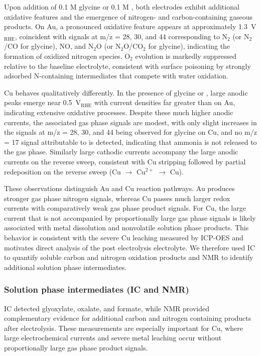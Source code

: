 \documentclass[twoside,twocolumn,9pt]{article}
\begin{document}
Upon addition of 0.1 M glycine or 0.1 M , both electrodes exhibit additional oxidative features and the emergence of nitrogen- and carbon-containing gaseous products. On Au, a pronounced oxidative feature appears at approximately 1.3~V$_{\mathrm{RHE}}$, coincident with signals at m/z = 28, 30, and 44 corresponding to N$_2$ (or N$_2$/CO for glycine), NO, and N$_2$O (or N$_2$O/CO$_2$ for glycine), indicating the formation of oxidized nitrogen species. O$_2$ evolution is markedly suppressed relative to the baseline electrolyte, consistent with surface poisoning by strongly adsorbed N-containing intermediates that compete with water oxidation.

Cu behaves qualitatively differently. In the presence of glycine or , large anodic peaks emerge near 0.5~V$_{\mathrm{RHE}}$ with current densities far greater than on Au, indicating extensive oxidative processes. Despite these much higher anodic currents, the associated gas phase signals are modest, with only slight increases in the signals at m/z = 28, 30, and 44 being observed for glycine on Cu, and no m/z = 17 signal attributable to  is detected, indicating that ammonia is not released to the gas phase. Similarly large cathodic currents accompany the large anodic currents on the reverse sweep, consistent with Cu stripping followed by partial redeposition on the reverse sweep (Cu $\to$ Cu$^{2+}$ $\to$ Cu).

These observations distinguish Au and Cu reaction pathways. Au produces stronger gas phase nitrogen signals, whereas Cu passes much larger redox currents with comparatively weak gas phase product signals. For Cu, the large current that is not accompanied by proportionally large gas phase signals is likely associated with metal dissolution and nonvolatile solution phase products. This behavior is consistent with the severe Cu leaching measured by ICP-OES and motivates direct analysis of the post electrolysis electrolyte. We therefore used IC to quantify soluble carbon and nitrogen oxidation products and NMR to identify additional solution phase intermediates.

\subsubsection{Solution phase intermediates (IC and NMR)}
\label{sec:NMR}

IC detected glyoxylate, oxalate, and formate, while NMR provided complementary evidence for additional carbon and nitrogen containing products after electrolysis. These measurements are especially important for Cu, where large electrochemical currents and severe metal leaching occur without proportionally large gas phase product signals.
\end{document}

